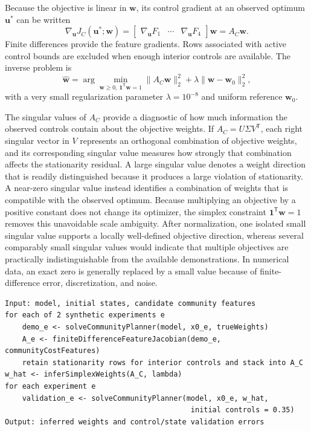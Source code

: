 \documentclass[11pt,a4paper]{article}
\newcommand{\vect}[1]{\boldsymbol{#1}}
\begin{document}
Because the objective is linear in \(\vect{w}\), its control gradient at an
observed optimum \(\vect{u}^{*}\) can be written
\begin{equation}
  \nabla_{\vect{u}}J_C(\vect{u}^{*};\vect{w})
  =
  \begin{bmatrix}
    \nabla_{\vect{u}}F_1 &
    \cdots &
    \nabla_{\vect{u}}F_4
  \end{bmatrix}
  \vect{w}
  = A_C\vect{w}.
\end{equation}
Finite differences provide the feature gradients. Rows associated with active
control bounds are excluded when enough interior controls are available. The
inverse problem is
\begin{equation}
  \hat{\vect{w}} =
  \arg\min_{\vect{w}\ge0,\ \vect{1}^{\mathsf T}\vect{w}=1}
  \|A_C\vect{w}\|_2^2
  +\lambda\|\vect{w}-\vect{w}_0\|_2^2,
\end{equation}
with a very small regularization parameter
\(\lambda=10^{-8}\) and uniform reference \(\vect{w}_0\).

The singular values of \(A_C\) provide a diagnostic of how much information
the observed controls contain about the objective weights. If
\(A_C=U\Sigma V^{\mathsf T}\), each right singular vector in \(V\) represents
an orthogonal combination of objective weights, and its corresponding singular
value measures how strongly that combination affects the stationarity
residual. A large singular value denotes a weight direction that is readily
distinguished because it produces a large violation of stationarity. A
near-zero singular value instead identifies a combination of weights that is
compatible with the observed optimum. Because multiplying an objective by a
positive constant does not change its optimizer, the simplex constraint
\(\vect{1}^{\mathsf T}\vect{w}=1\) removes this unavoidable scale ambiguity.
After normalization, one isolated small singular value supports a locally
well-defined objective direction, whereas several comparably small singular
values would indicate that multiple objectives are practically
indistinguishable from the available demonstrations. In numerical data, an
exact zero is generally replaced by a small value because of finite-difference
error, discretization, and noise.

\noindent\begin{minipage}{\linewidth}
\begin{lstlisting}[style=pseudostyle,title={Compact MATLAB pseudocode}]
Input: model, initial states, candidate community features
for each of 2 synthetic experiments e
    demo_e <- solveCommunityPlanner(model, x0_e, trueWeights)
    A_e <- finiteDifferenceFeatureJacobian(demo_e, communityCostFeatures)
    retain stationarity rows for interior controls and stack into A_C
w_hat <- inferSimplexWeights(A_C, lambda)
for each experiment e
    validation_e <- solveCommunityPlanner(model, x0_e, w_hat,
                                           initial controls = 0.35)
Output: inferred weights and control/state validation errors
\end{lstlisting}
\end{minipage}
\end{document}
